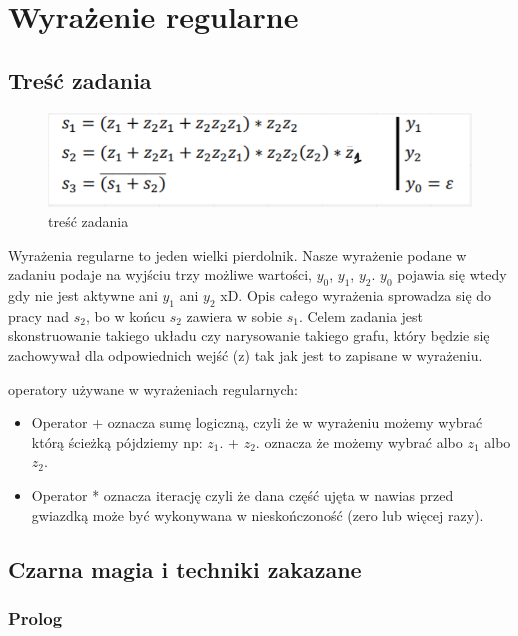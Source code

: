 \section{Wyrażenie regularne}

\subsection{Treść zadania}

\begin{figure}[h!]
    \centering
    \includegraphics[width=.8\textwidth]{images/regex/reg_ex.png}
    \caption{treść zadania}
    \label{fig:my_label}
\end{figure}

Wyrażenia regularne to jeden wielki pierdolnik. Nasze wyrażenie podane w zadaniu podaje na wyjściu trzy możliwe wartości, $y_0$, $y_1$, $y_2$. $y_0$ pojawia się wtedy gdy nie jest aktywne ani $y_1$ ani $y_2$ xD. Opis całego wyrażenia sprowadza się do pracy nad $s_2$, bo w końcu $s_2$ zawiera w sobie $s_1$. Celem zadania jest skonstruowanie takiego układu czy narysowanie takiego grafu, który będzie się zachowywał dla odpowiednich wejść (z) tak jak jest to zapisane w wyrażeniu.

operatory używane w wyrażeniach regularnych:
\begin{itemize}
    \item Operator + oznacza sumę logiczną, czyli że w wyrażeniu możemy wybrać którą ścieżką pójdziemy np: $z_1$. + $z_2$. oznacza że możemy wybrać albo $z_1$ albo $z_2$. 
    \item Operator * oznacza iterację czyli że dana część ujęta w nawias przed gwiazdką może być wykonywana w nieskończoność (zero lub więcej razy).
\end{itemize}

\subsection{Czarna magia i techniki zakazane}

\subsubsection{Prolog}

